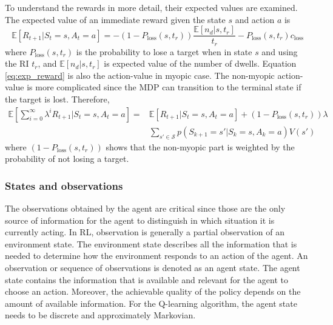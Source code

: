 \documentclass[english, 12pt, a4paper, elec, utf8, a-1b, online]{aaltothesis}
\numberwithin{equation}{section}
\newcommand{\ploss}{P_\text{loss}}
\newcommand{\Ss}{\mathcal{S}}
\newcommand{\E}[1]{\mathbb{E}\left[ #1 \right]}
\newcommand{\closs}{c_\text{loss}}
\newcommand{\ri}{t_r}
\begin{document}
To understand the rewards in more detail, their expected values are examined.
The expected value of an immediate reward given the state $s$ and action $a$ is
\begin{equation}\label{eq:exp_reward}
    \E{R_{t+1} | S_t=s, A_t=a} = -(1-\ploss(s, \ri)) 
        \frac
        {
            \mathbb{E} \left[ n_d | s, \ri \right]
        }
        {
        \ri
        } 
        - \ploss(s, \ri) \closs
\end{equation}
where $\ploss(s, \ri)$ is the probability to lose a target when in state $s$ and using the RI $\ri$, and $\E{n_d|s, \ri}$ is expected value of the number of dwells.
Equation \eqref{eq:exp_reward} is also the action-value in myopic case.
The non-myopic action-value is more complicated since the MDP can transition to the terminal state if the target is lost.
Therefore, 
\begin{align}
    \E{\sum_{i=0}^\infty \lambda^i R_{t+1} | S_t=s, A_t=a} =& \E{R_{t+1} | S_t=s, A_t=a} + (1-\ploss(s, \ri)) \lambda \\
    & \sum_{s'\in \Ss} p(S_{k+1}=s'|S_{k}=s, A_{k}=a)  V(s')  
\end{align}
where $(1-\ploss(s, \ri))$ shows that the non-myopic part is weighted by the probability of not losing a target.

\subsubsection{States and observations} \label{sec:states}


The observations obtained by the agent are critical since those are the only source of information for the agent to distinguish in which situation it is currently acting.
In RL, observation is generally a partial observation of an environment state.
The environment state describes all the information that is needed to determine how the environment responds to an action of the agent. 
An observation or sequence of observations is denoted as an agent state.
The agent state contains the information that is available and relevant for the agent to choose an action.
Moreover, the achievable quality of the policy depends on the amount of available information.
For the Q-learning algorithm, the agent state needs to be discrete and approximately Markovian.
\end{document}
